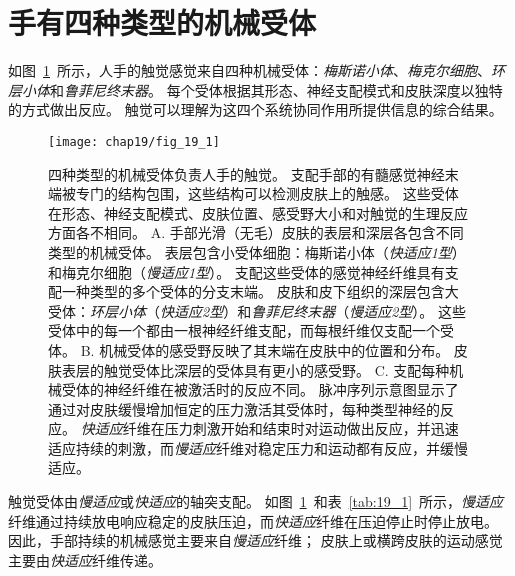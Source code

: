 \section{手有四种类型的机械受体}

如图~\ref{fig:19_1}~所示，人手的触觉感觉来自四种机械受体：\textit{梅斯诺小体}、\textit{梅克尔细胞}、\textit{环层小体}和\textit{鲁菲尼终末器}。
每个受体根据其形态、神经支配模式和皮肤深度以独特的方式做出反应。
触觉可以理解为这四个系统协同作用所提供信息的综合结果。


\begin{figure}[htbp]
	\centering
	\texttt{[image: chap19/fig\_19\_1]}
	\caption{四种类型的机械受体负责人手的触觉。
		支配手部的有髓感觉神经末端被专门的结构包围，这些结构可以检测皮肤上的触感。
		这些受体在形态、神经支配模式、皮肤位置、感受野大小和对触觉的生理反应方面各不相同\cite{johansson1983tactile}。
		A. 手部光滑（无毛）皮肤的表层和深层各包含不同类型的机械受体。
		表层包含小受体细胞：梅斯诺小体（\textit{快适应1型}）和梅克尔细胞（\textit{慢适应1型}）。
		支配这些受体的感觉神经纤维具有支配一种类型的多个受体的分支末端。
		皮肤和皮下组织的深层包含大受体：\textit{环层小体}（\textit{快适应2型}）和\textit{鲁菲尼终末器}（\textit{慢适应2型}）。
		这些受体中的每一个都由一根神经纤维支配，而每根纤维仅支配一个受体。
		B. 机械受体的感受野反映了其末端在皮肤中的位置和分布。
		皮肤表层的触觉受体比深层的受体具有更小的感受野。
		C. 支配每种机械受体的神经纤维在被激活时的反应不同。
		脉冲序列示意图显示了通过对皮肤缓慢增加恒定的压力激活其受体时，每种类型神经的反应。
		\textit{快适应}纤维在压力刺激开始和结束时对运动做出反应，并迅速适应持续的刺激，而\textit{慢适应}纤维对稳定压力和运动都有反应，并缓慢适应。}
	\label{fig:19_1}
\end{figure}


触觉受体由\textit{慢适应}或\textit{快适应}的轴突支配。
如图~\ref{fig:19_1}~和表~\ref{tab:19_1}~所示，\textit{慢适应}纤维通过持续放电响应稳定的皮肤压迫，而\textit{快适应}纤维在压迫停止时停止放电。
因此，手部持续的机械感觉主要来自\textit{慢适应}纤维；
皮肤上或横跨皮肤的运动感觉主要由\textit{快适应}纤维传递。



